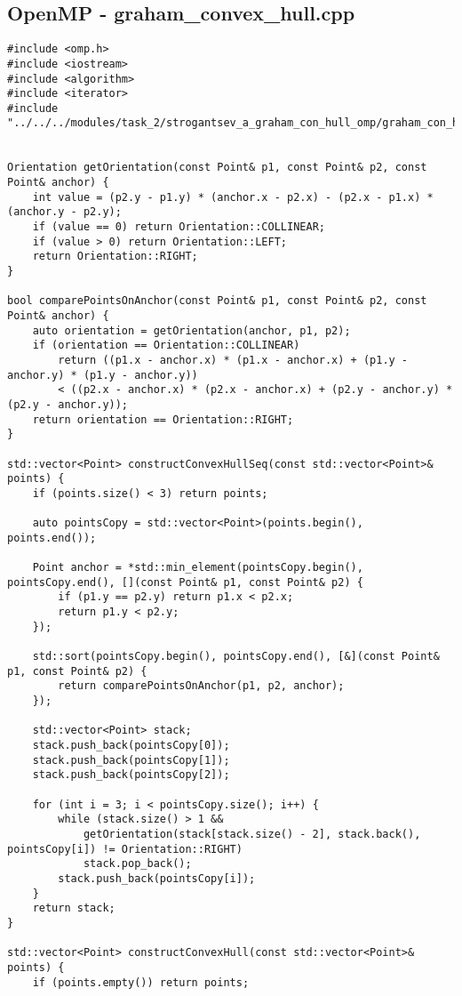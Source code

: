 \documentclass[14pt, a4paper]{extarticle}
\begin{document}
    \subsection{OpenMP - graham\_convex\_hull.cpp}
  \begin{lstlisting}
#include <omp.h>
#include <iostream>
#include <algorithm>
#include <iterator>
#include "../../../modules/task_2/strogantsev_a_graham_con_hull_omp/graham_con_hull_omp.h"


Orientation getOrientation(const Point& p1, const Point& p2, const Point& anchor) {
    int value = (p2.y - p1.y) * (anchor.x - p2.x) - (p2.x - p1.x) * (anchor.y - p2.y);
    if (value == 0) return Orientation::COLLINEAR;
    if (value > 0) return Orientation::LEFT;
    return Orientation::RIGHT;
}

bool comparePointsOnAnchor(const Point& p1, const Point& p2, const Point& anchor) {
    auto orientation = getOrientation(anchor, p1, p2);
    if (orientation == Orientation::COLLINEAR)
        return ((p1.x - anchor.x) * (p1.x - anchor.x) + (p1.y - anchor.y) * (p1.y - anchor.y))
        < ((p2.x - anchor.x) * (p2.x - anchor.x) + (p2.y - anchor.y) * (p2.y - anchor.y));
    return orientation == Orientation::RIGHT;
}

std::vector<Point> constructConvexHullSeq(const std::vector<Point>& points) {
    if (points.size() < 3) return points;

    auto pointsCopy = std::vector<Point>(points.begin(), points.end());

    Point anchor = *std::min_element(pointsCopy.begin(), pointsCopy.end(), [](const Point& p1, const Point& p2) {
        if (p1.y == p2.y) return p1.x < p2.x;
        return p1.y < p2.y;
    });

    std::sort(pointsCopy.begin(), pointsCopy.end(), [&](const Point& p1, const Point& p2) {
        return comparePointsOnAnchor(p1, p2, anchor);
    });

    std::vector<Point> stack;
    stack.push_back(pointsCopy[0]);
    stack.push_back(pointsCopy[1]);
    stack.push_back(pointsCopy[2]);

    for (int i = 3; i < pointsCopy.size(); i++) {
        while (stack.size() > 1 &&
            getOrientation(stack[stack.size() - 2], stack.back(), pointsCopy[i]) != Orientation::RIGHT)
            stack.pop_back();
        stack.push_back(pointsCopy[i]);
    }
    return stack;
}

std::vector<Point> constructConvexHull(const std::vector<Point>& points) {
    if (points.empty()) return points;


\end{lstlisting}
\end{document}
